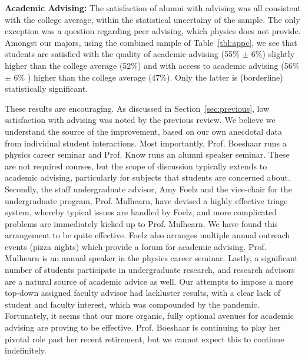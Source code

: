 \documentclass[12pt]{article}
\begin{document}
\noindent
{\bf Academic Advising:}
The satisfaction of alumni with advising was all
consistent with the college average, within the statistical uncertainy
of the sample.  The only exception was a question regarding peer
advising, which physics does not provide.  Amongst our majors, using
the combined sample of Table~\ref{tbl:appc}, we see that students are
satisfied with the quality of academic advising (55\% $\pm$ 6\%)
slightly higher than the college average (52\%) and with access to
academic advising (56\% $\pm$ 6\% ) higher than the college average
(47\%).  Only the latter is (borderline) statistically significant.

These results are encouraging.  As discussed in
Section~\ref{sec:previous}, low satisfaction with advising was noted
by the previous review.  We believe we understand the source of the
improvement, based on our own anecdotal data from individual student
interactions.  Most importantly, Prof. Boeshaar runs a physics career
seminar and Prof. Know runs an alumni speaker seminar.  These are not
required courses, but the scope of discussion typically extends to
academic advising, particularly for subjects that students are
concerned about.  Secondly, the staff undergraduate advisor, Amy Foelz
and the vice-chair for the undergraduate program, Prof. Mulhearn, have
devised a highly effective triage system, whereby typical issues are
handled by Foelz, and more complicated problems are immediately kicked
up to Prof. Mulhearn.  We have found this arrangement to be quite
effective.  Foelz also arranges multiple annual outreach events (pizza
nights) which provide a forum for academic advising.  Prof. Mulhearn
is an annual speaker in the physics career seminar.  Lastly, a
significant number of students participate in undergraduate research,
and research advisors are a natural source of academic advice as well.
Our attempts to impose a more top-down assigned faculty advisor had
lackluster results, with a clear lack of student and faculty interest,
which was compounded by the pandemic.  Fortunately, it seems that our
more organic, fully optional avenues for academic advising are proving
to be effective.  Prof. Boeshaar is continuing to play her pivotal role past
her recent retirement, but we cannot expect this to continue
indefinitely.\\[3pt]
\end{document}
